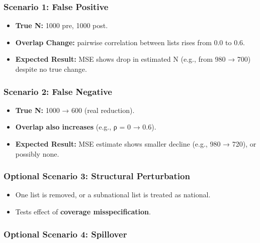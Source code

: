 \documentclass[
  12pt,
]{article}
\providecommand{\tightlist}{%
  \setlength{\itemsep}{0pt}\setlength{\parskip}{0pt}}\usepackage{longtable,booktabs,array}
\theoremstyle{plain}
\theoremstyle{definition}
\begin{document}
\subsubsection{Scenario 1: False
Positive}\label{scenario-1-false-positive}

\begin{itemize}
\tightlist
\item
  \textbf{True N:} 1000 pre, 1000 post.\\
\item
  \textbf{Overlap Change:} pairwise correlation between lists rises from
  0.0 to 0.6.\\
\item
  \textbf{Expected Result:} MSE shows drop in estimated N (e.g., from
  980 → 700) despite no true change.
\end{itemize}

\subsubsection{Scenario 2: False
Negative}\label{scenario-2-false-negative}

\begin{itemize}
\tightlist
\item
  \textbf{True N:} 1000 → 600 (real reduction).\\
\item
  \textbf{Overlap also increases} (e.g., ρ = 0 → 0.6).\\
\item
  \textbf{Expected Result:} MSE estimate shows smaller decline (e.g.,
  980 → 720), or possibly none.
\end{itemize}

\subsubsection{Optional Scenario 3: Structural
Perturbation}\label{optional-scenario-3-structural-perturbation}

\begin{itemize}
\tightlist
\item
  One list is removed, or a subnational list is treated as national.\\
\item
  Tests effect of \textbf{coverage misspecification}.
\end{itemize}

\subsubsection{Optional Scenario 4:
Spillover}\label{optional-scenario-4-spillover}
\end{document}
